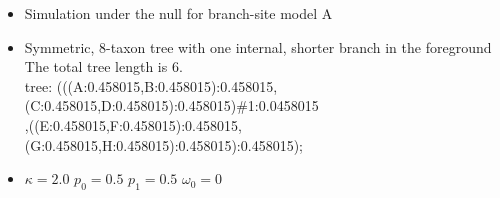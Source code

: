 \documentclass[12pt,letterpaper]{article}\usepackage[]{graphicx}\usepackage[]{color}
\newenvironment{knitrout}{}{} %
\begin{document}
\begin{itemize}
\item Simulation under the null for branch-site model A
\item Symmetric, 8-taxon tree with one internal, shorter branch in the foreground \\
  The total tree length is 6.\\
  tree: (((A:0.458015,B:0.458015):0.458015,(C:0.458015,D:0.458015):0.458015)\#1:0.0458015\\,((E:0.458015,F:0.458015):0.458015,(G:0.458015,H:0.458015):0.458015):0.458015);
\item $\kappa=2.0$ $p_0=0.5$ $p_1=0.5$ $\omega_0=0$
\end{itemize}

\begin{knitrout}
\color{fgcolor}


\end{knitrout}
\end{document}
